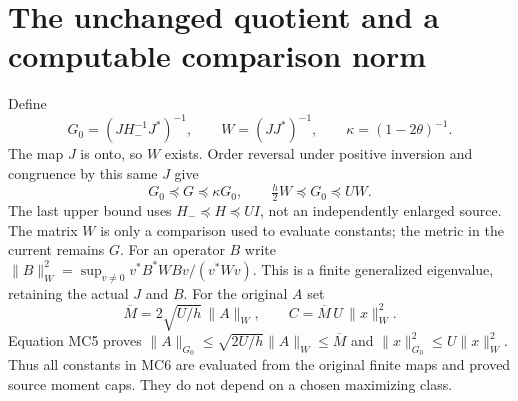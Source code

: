 \documentclass[11pt]{article}
\begin{document}
\section{The unchanged quotient and a computable comparison norm}
Define
\[
 G_0=(JH_-^{-1}J^*)^{-1},\qquad W=(JJ^*)^{-1},\qquad
 \kappa=(1-2\theta)^{-1}.
\]
The map $J$ is onto, so $W$ exists. Order reversal under positive
inversion and congruence by this same $J$ give
\[
 G_0\preceq G\preceq\kappa G_0,\qquad
 \tfrac h2 W\preceq G_0\preceq UW.                            \tag{MC5}
\]
The last upper bound uses $H_-\preceq H\preceq UI$, not an
independently enlarged source. The matrix $W$ is only a comparison
used to evaluate constants; the metric in the current remains $G$.
For an operator $B$ write
$\|B\|_W^2=\sup_{v\ne0}v^*B^*WBv/(v^*Wv)$. This is a finite
generalized eigenvalue, retaining the actual $J$ and $B$.
For the original $A$ set
\[
 \overline M=2\sqrt{U/h}\,\|A\|_W,\qquad
 C=\overline M\,U\,\|x\|_W^2.                                \tag{MC6}
\]
Equation MC5 proves $\|A\|_{G_0}\le\sqrt{2U/h}\|A\|_W
\le\overline M$ and $\|x\|_{G_0}^2\le U\|x\|_W^2$.
Thus all constants in MC6 are evaluated from the original finite maps
and proved source moment caps. They do not depend on a chosen
maximizing class.
\end{document}
